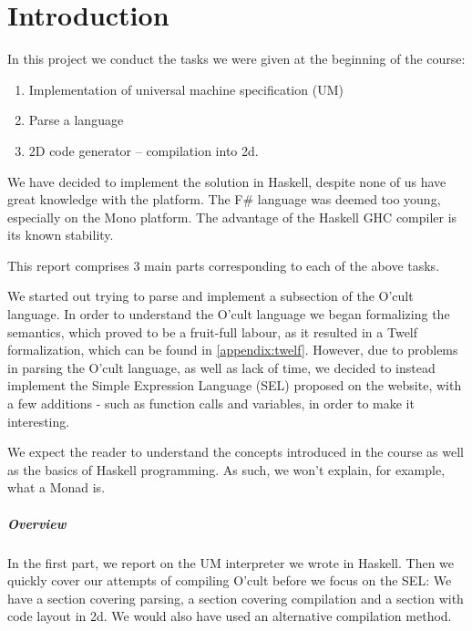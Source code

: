 \chapter{Introduction}

In this project we conduct the tasks we were given at the beginning of
the course:
\begin{enumerate}
\item Implementation of universal machine specification (UM)
\item Parse a language
\item 2D code generator -- compilation into 2d.
\end{enumerate}
We have decided to implement the solution in Haskell, despite none of
us have great knowledge with the platform. The F\# language was deemed
too young, especially on the Mono platform. The
advantage of the Haskell GHC compiler is its known stability.

This report comprises 3 main parts corresponding to each of the
above tasks.

We started out trying to parse and implement a subsection of the O'cult
language. In order to understand the O'cult language we began
formalizing the semantics, which proved to be a fruit-full labour, as
it resulted in a Twelf formalization, which can be found in
\ref{appendix:twelf}. However, due to problems in parsing the O'cult
language, as well as lack of time, we decided to instead implement the
Simple Expression Language (SEL) proposed on the website, with a few
additions - such as function calls and variables, in order to make it interesting.

We expect the reader to understand the concepts introduced in the
course as well as the basics of Haskell programming. As such, we won't
explain, for example, what a Monad is.

\paragraph{Overview}
In the first part, we report on the UM interpreter we wrote in
Haskell. Then we quickly cover our attempts of compiling O'cult before
we focus on the SEL: We have a section covering parsing, a section
covering compilation and a section with code layout in 2d. We would
also have used an alternative compilation method.

